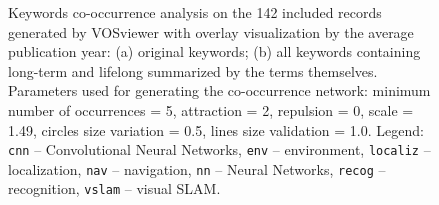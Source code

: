\begin{figure}[!t]
  \centering
  \hfill
  \caption{Keywords co-occurrence analysis on the 142 included records generated by VOSviewer with overlay visualization by the average publication year: (a) original keywords; (b) all keywords containing long-term and lifelong summarized by the terms themselves. Parameters used for generating the co-occurrence network: minimum number of occurrences = 5, attraction = 2, repulsion = 0, scale = 1.49, circles size variation = 0.5, lines size validation = 1.0. Legend: \texttt{cnn} -- Convolutional Neural Networks, \texttt{env} -- environment, \texttt{localiz} -- localization, \texttt{nav} -- navigation, \texttt{nn} -- Neural Networks, \texttt{recog} -- recognition, \texttt{vslam} -- visual SLAM.}
  \label{fig:overview:kw}
\end{figure}

